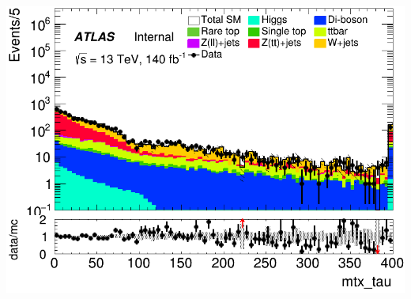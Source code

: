 \documentclass[usenames,dvipsnames]{beamer}
\begin{document}
\begin{frame}
\begin{minipage}{0.32\textwidth}
        \includegraphics[width=\textwidth]{graphics/H_met/H_met_mtx_tau.png}
    \end{minipage}
\end{frame}
\end{document}
